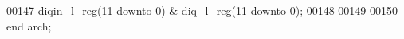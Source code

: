 \begin{DoxyCode}
00147      \textcolor{vhdlchar}{diqin_l_reg}\textcolor{vhdlchar}{(}\textcolor{vhdllogic}{}\textcolor{vhdllogic}{11} \textcolor{keywordflow}{downto} \textcolor{vhdllogic}{}\textcolor{vhdllogic}{0}\textcolor{vhdlchar}{)} \textcolor{vhdlchar}{&} \textcolor{vhdlchar}{diq_l_reg}\textcolor{vhdlchar}{(}\textcolor{vhdllogic}{}\textcolor{vhdllogic}{11} \textcolor{keywordflow}{downto} \textcolor{vhdllogic}{}\textcolor{vhdllogic}{0}\textcolor{vhdlchar}{)};
00148 
00149   
00150 \textcolor{keywordflow}{end} \textcolor{vhdlchar}{arch};  
\end{DoxyCode}
